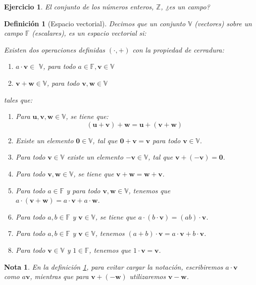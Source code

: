 \documentclass[11pt]{report}
\theoremstyle{break}
\newtheorem{definicion}{Definición}[chapter]
\newtheorem{nota}{Nota}[chapter]
\newtheorem{ejercicio}{Ejercicio}[chapter]
\theoremstyle{break}
\newcommand{\mbb}[1]{$\mathbb{#1}$}
\begin{document}
\begin{ejercicio}
El conjunto de los números enteros, $\mathbb{Z}$, ¿es un campo?
\end{ejercicio}

\begin{definicion}[Espacio vectorial]
\label{definicion:espacio-vectorial}
Decimos que un conjunto \mbb{V} (vectores) sobre un campo \mbb{F} (escalares), es un espacio vectorial si:

Existen dos operaciones definidas $(\cdot, +)$ con la propiedad de cerradura:
\begin{enumerate}
\item $a \cdot \bm{v} \in$ \mbb{V}, para todo $a \in \mathbb{F}, \bm{v} \in \mathbb{V}$
\item $\bm{v} + \bm{w} \in \mathbb{V}$, para todo $ \bm{v}, \bm{w} \in \mathbb{V}$
\end{enumerate}

tales que:

\begin{enumerate}[label=\alph*)]
\item Para $\bm{u}, \bm{v}, \bm{w} \in \mathbb{V}$, se tiene que:
$$ (\bm{u} + \bm{v}) + \bm{w} = \bm{u} + (\bm{v} + \bm{w})$$
\item Existe un elemento $\bm{0} \in \mathbb{V}$, tal que $\bm{0} + \bm{v} = \bm{v} $ para todo $\bm{v} \in \mathbb{V}$.
\item Para todo $\bm{v} \in \mathbb{V}$ existe un elemento $\bm{-v} \in \mathbb{V}$, tal que $\bm{v} + (\bm{-v}) = \bm{0}$.
\item Para todo $\bm{v}, \bm{w} \in \mathbb{V}$, se tiene que $\bm{v} + \bm{w} = \bm{w} + \bm{v}$.
\item Para todo $a \in \mathbb{F}$ y para todo $\bm{v}, \bm{w} \in \mathbb{V}$, tenemos que $a \cdot (\bm{v} + \bm{w}) = a \cdot \bm{v} + a \cdot \bm{w}$.
\item Para todo $a,b \in \mathbb{F}$ y $\bm{v} \in \mathbb{V}$, se tiene que $a \cdot (b \cdot \bm{v}) = (ab) \cdot \bm{v}$.
\item Para todo $a,b \in \mathbb{F}$ y $\bm{v} \in \mathbb{V}$, tenemos $(a + b) \cdot \bm{v} = a \cdot \bm{v} + b \cdot \bm{v}$.
\item Para todo $\bm{v} \in \mathbb{V}$ y $1 \in \mathbb{F}$, tenemos que $1 \cdot \bm{v} = \bm{v}$.
\end{enumerate}
\end{definicion}

\begin{nota}
En la definición \ref{definicion:espacio-vectorial}, para evitar cargar la notación, escribiremos $a \cdot \bm{v}$ como $a\bm{v}$, mientras que para $\bm{v} + (\bm{-w})$ utilizaremos $\bm{v} - \bm{w}$.
\end{nota}
\end{document}
